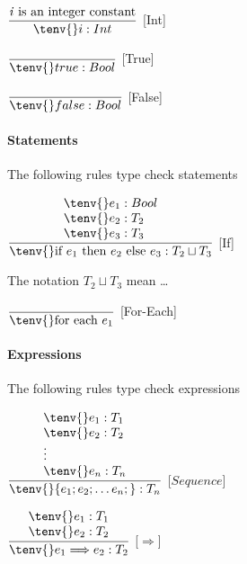 \hspace*{10em} $ \dfrac{\text{\textit{i} is an integer constant}}
{\tenv{} i: Int}$ [Int]\bigskip

\hspace*{10em} $ \dfrac{\phantom{}}{\tenv{} true: Bool}$ [True]\bigskip

\hspace*{10em} $ \dfrac{\phantom{}}{\tenv{} false: Bool}$ [False]


\paragraph{Statements}
The following rules type check statements \bigskip

\hspace*{10em} $ \dfrac{\begin{array}{l}
	{\tenv{} e_1: Bool} \\
	{\tenv{} e_2: T_2} \\
	{\tenv{} e_3: T_3} \\
\end{array}}
{\tenv{} \text{if } e_1 \text{ then } e_2 \text{ else } e_3: T_2 \sqcup T_3}$
[If]\bigskip

The notation $T_2 \sqcup T_3$ mean \ldots

\hspace*{10em}
$
\dfrac
{\phantom{}}
{\tenv{} \text{for each } e_1 }
$
[For-Each]\bigskip

\paragraph{Expressions}
The following rules type check expressions \bigskip

\hspace*{10em}
$
\dfrac
{
\begin{array}{l}
	{\tenv{} e_1: T_1} \\
	{\tenv{} e_2: T_2} \\
	\vdots \\
	{\tenv{} e_n: T_n}
\end{array}
}
{\tenv{} \{e_1 ; e_2 ; \ldots e_n; \}: T_n}
$
[$Sequence$]\bigskip

\hspace*{10em}
$
\dfrac
{
\begin{array}{l}
	{\tenv{} e_1: T_1} \\
	{\tenv{} e_2: T_2}
\end{array}
}
{\tenv{} e_1 \Longrightarrow e_2 : T_2}
$
[$\Longrightarrow$]

